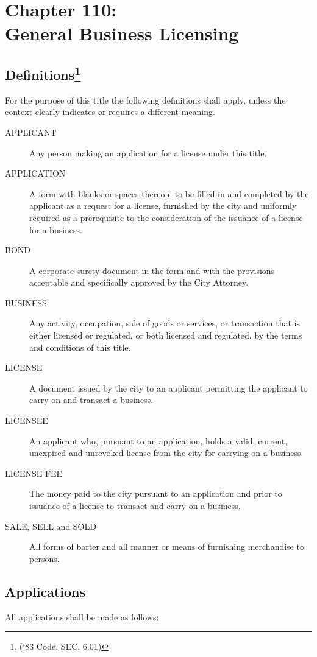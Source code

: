 \chapter*{Chapter 110: \\
	General Business Licensing}
    \vfill
    \minitoc
    \pagebreak

\section{Definitions\footnote{(‘83 Code, SEC. 6.01)}}
For the purpose of this title the following definitions shall apply, unless the context clearly indicates or requires a different meaning.
\begin{description}
    \item[APPLICANT]  Any person making an application for a license under this title.
    \item[APPLICATION]  A form with blanks or spaces thereon, to be filled in and completed by the applicant as a request for a license, furnished by the city and uniformly required as a prerequisite to the consideration of the issuance of a license for a business.
    \item[BOND]  A corporate surety document in the form and with the provisions acceptable and specifically approved by the City Attorney.
    \item[BUSINESS]  Any activity, occupation, sale of goods or services, or transaction that is either licensed or regulated, or both licensed and regulated, by the terms and conditions of this title.
    \item[LICENSE]  A document issued by the city to an applicant permitting the applicant to carry on and transact a business.
    \item[LICENSEE]  An applicant who, pursuant to an application, holds a valid, current, unexpired and unrevoked license from the city for carrying on a business.
    \item[LICENSE FEE]  The money paid to the city pursuant to an application and prior to issuance of a license to transact and carry on a business.
    \item[SALE, SELL and SOLD]  All forms of barter and all manner or means of furnishing merchandise to persons.
\end{description}

\section{Applications}
All applications shall be made as follows:
